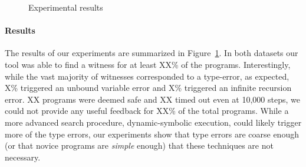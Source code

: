 \begin{figure}[t]


\caption{Experimental results}
\label{fig:results-witness}
\end{figure}

\paragraph{Results}
\label{sec:results-witness}
The results of our experiments are summarized in
Figure~\ref{fig:results-witness}.
%
In both datasets our tool was able to find a witness for at least XX\%
of the programs.
%
Interestingly, while the vast majority of witnesses corresponded to a
type-error, as expected, X\% triggered an unbound variable error and X\%
triggered an infinite recursion error.
%
XX programs were deemed safe and XX timed out even at 10,000 steps, \ie
we could not provide any useful feedback for XX\% of the total programs.
%
While a more advanced search procedure, \eg dynamic-symbolic execution,
could likely trigger more of the type errors, our experiments show that
type errors are coarse enough (or that novice programs are \emph{simple}
enough) that these techniques are not necessary.



